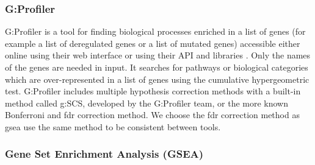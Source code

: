 \subsubsection{G:Profiler}
G:Profiler is a tool for finding biological processes enriched in a list of genes (for example a list of deregulated genes or a list of mutated genes) accessible either online using their web interface or using their API and libraries \cite*{Raudvere2019}.
Only the names of the genes are needed in input.
It searches for pathways or biological categories which are over-represented in a list of genes using the cumulative hypergeometric test.
G:Profiler includes multiple hypothesis correction methods with a built-in method called g:SCS, developed by the G:Profiler team, or the more known Bonferroni and \acrshort{fdr} correction method.
We choose the \acrshort{fdr} correction method as \acrshort{gsea} use the same method to be consistent between tools.

\subsubsection{Gene Set Enrichment Analysis (GSEA)}

